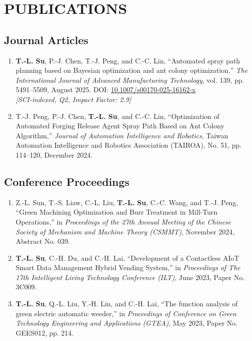 \documentclass[11pt,a4paper]{article}
\newcommand{\publication}[1]{
    \item #1
}
\begin{document}
\section*{PUBLICATIONS}

\subsection*{Journal Articles}

\begin{enumerate}[leftmargin=*, itemsep=6pt]
    \publication{\textbf{T.-L. Su}, P.-J. Chen, T.-J. Peng, and C.-C. Lin, ``Automated spray path planning based on Bayesian optimization and ant colony optimization,'' \textit{The International Journal of Advanced Manufacturing Technology}, vol. 139, pp. 5491--5509, August 2025. DOI: \href{https://doi.org/10.1007/s00170-025-16162-x}{10.1007/s00170-025-16162-x}\\
    \textit{[SCI-indexed, Q2, Impact Factor: 2.9]}}

    \publication{T.-J. Peng, P.-J. Chen, \textbf{T.-L. Su}, and C.-C. Lin, ``Optimization of Automated Forging Release Agent Spray Path Based on Ant Colony Algorithm,'' \textit{Journal of Automation Intelligence and Robotics}, Taiwan Automation Intelligence and Robotics Association (TAIROA), No. 51, pp. 114--120, December 2024.}
\end{enumerate}

\subsection*{Conference Proceedings}

\begin{enumerate}[leftmargin=*, itemsep=6pt, resume]
    \publication{Z.-L. Sun, T.-S. Liaw, C.-L. Liu, \textbf{T.-L. Su}, C.-C. Wang, and T.-J. Peng, ``Green Machining Optimization and Burr Treatment in Mill-Turn Operations,'' in \textit{Proceedings of the 27th Annual Meeting of the Chinese Society of Mechanism and Machine Theory (CSMMT)}, November 2024, Abstract No. 039.}

    \publication{\textbf{T.-L. Su}, C.-H. Du, and C.-H. Lai, ``Development of a Contactless AIoT Smart Data Management Hybrid Vending System,'' in \textit{Proceedings of The 17th Intelligent Living Technology Conference (ILT)}, June 2023, Paper No. 3C009.}

    \publication{\textbf{T.-L. Su}, Q.-L. Liu, Y.-H. Lin, and C.-H. Lai, ``The function analysis of green electric automatic weeder,'' in \textit{Proceedings of Conference on Green Technology Engineering and Applications (GTEA)}, May 2023, Paper No. GEES012, pp. 214.}
\end{enumerate}
\end{document}
